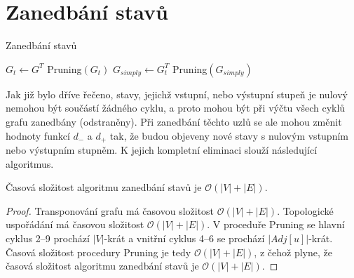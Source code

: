     \section{Zanedbání stavů}
        \begin{algorithm}
            \DontPrintSemicolon
            \caption{Zanedbání stavů}
            \vspace*{0.5em}

            \vspace*{0.5em}

            $G_t \leftarrow G^T$ 
            Pruning$(G_t)$ 
            $G_{simply} \leftarrow G_t^T$ 
            Pruning$(G_{simply})$ 
            \vspace*{0.5em}


        \end{algorithm}

        Jak již bylo dříve řečeno, stavy, jejichž vstupní, nebo výstupní stupeň je nulový nemohou být součástí žádného cyklu, a proto mohou být při výčtu všech cyklů grafu zanedbány (odstraněny). Při zanedbání těchto uzlů se ale mohou změnit hodnoty funkcí $d_-$ a $d_+$ tak, že budou objeveny nové stavy s nulovým vstupním nebo výstupním stupněm. K jejich kompletní eliminaci slouží následující algoritmus.

        \begin{theorem}
            Časová složitost algoritmu zanedbání stavů je $\mathcal{O}(|V| + |E|)$.
        \end{theorem}

        \begin{proof}
            Transponování grafu má časovou složitost $\mathcal{O}(|V| + |E|)$. Topologické uspořádání má časovou složitost $\mathcal{O}(|V| + |E|)$. V proceduře Pruning se hlavní cyklus 2--9 prochází $|V|$-krát a vnitřní cyklus 4--6 se prochází $|Adj[u]|$-krát. Časová složitost procedury Pruning je tedy $\mathcal{O}(|V| + |E|)$, z čehož plyne, že časová složitost algoritmu zanedbání stavů je $\mathcal{O}(|V| + |E|)$.
        \end{proof}

